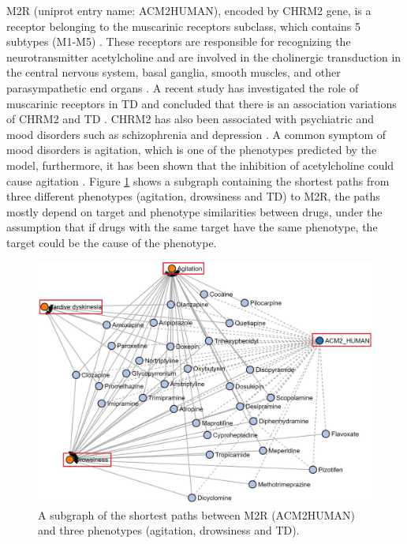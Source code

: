 M2R (uniprot entry name: ACM2\textunderscore HUMAN), encoded by CHRM2 gene, is a receptor belonging to the muscarinic receptors subclass, which contains 5 subtypes (M1-M5) \cite{kleinz_chapter_2008}. These receptors are responsible for recognizing the neurotransmitter acetylcholine and are involved in the cholinergic transduction in the central nervous system, basal ganglia, smooth muscles, and other parasympathetic end organs \cite{aronstam_muscarinic_2009}. A recent study has investigated the role of muscarinic receptors in \ac{TD} and concluded that there is an association variations of CHRM2 and \ac{TD} \cite{boiko_pharmacogenetics_2019}. CHRM2 has also been associated with psychiatric and mood disorders such as schizophrenia and depression \cite{drevets_antidepressant_2013, jeon_role_2015, dean_possible_2015}. A common symptom of mood disorders is agitation, which is one of the phenotypes predicted by the model, furthermore, it has been shown that the inhibition of acetylcholine could cause agitation \cite{carlson_physiology_2019}. Figure \ref{fig:chrm2_phenotypes} shows a subgraph containing the shortest paths from three different phenotypes (agitation, drowsiness and \ac{TD}) to M2R, the paths mostly depend on target and phenotype similarities between drugs, under the assumption that if drugs with the same target have the same phenotype, the target could be the cause of the phenotype.

\begin{figure}[h!]
    \centering
    \includegraphics[scale=0.6]
    {figures/chrm2_phenotypes.jpg}
    \caption{\label{fig:chrm2_phenotypes} A subgraph of the shortest paths between M2R (ACM2\textunderscore HUMAN) and three phenotypes (agitation, drowsiness and TD).}
\end{figure}


